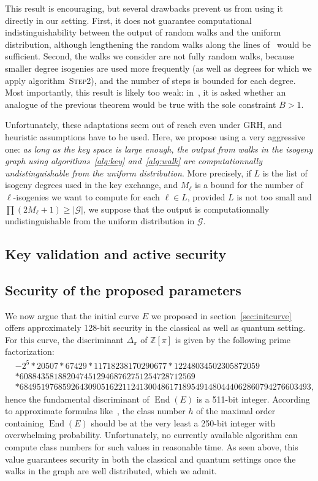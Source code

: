 \documentclass{article}
\newcommand{\Z}{\mathbb{Z}}
\newcommand{\Graph}{\mathcal{G}}
\newcommand{\algstyle}[1]{\textsc{#1}}
\theoremstyle{definition}
\DeclareMathOperator{\End}{End}
\begin{document}
This result is encouraging, but several drawbacks prevent us from
using it directly in our setting. First, it does not guarantee
computational indistinguishability between the output of random
walks and the uniform distribution, although lengthening the
random walks along the lines of~\cite[Theorem ...]{todo:expanders}
would be sufficient. Second, the walks we consider are not fully random
walks, because smaller degree isogenies are used more frequently
(as well as degrees for which we apply algorithm~\algstyle{Step2}),
and the number of steps is bounded for each degree. Most
importantly, this result is likely too weak: in~\cite[7.2]{jao+miller+venkatesan09},
it is asked whether an analogue of the previous theorem would
be true with the sole constraint $B>1$.

Unfortunately, these adaptations seem out of reach even under
GRH, and heuristic assumptions have to be used. Here, we propose using
a very aggressive one: \emph{as long as the key space is large
enough, the output from walks in the isogeny graph using algorithms~\ref{alg:key}
and~\ref{alg:walk} are computationnally undistinguishable from the uniform
distribution}. More precisely, if $L$ is the list of isogeny degrees used
in the key exchange, and $M_\ell$ is a bound for the number of $\ell$-isogenies
we want to compute for each $\ell\in L$, provided $L$ is not too small
and $\prod (2 M_\ell + 1) \geq |\Graph|$, we suppose that
the output is computationnally
undistinguishable from the uniform distribution in $\Graph$.

\subsection{Key validation and active security}



\subsection{Security of the proposed parameters}

We now argue that the initial curve $E$ we proposed in section~\ref{sec:initcurve}
offers approximately 128-bit security in the classical as well as quantum
setting. For this curve, the discriminant $\Delta_\pi$ of $\Z[\pi]$ is
given by the following prime factorization:
\[
\begin{aligned}
& -2^5 * 20507 * 67429 * 11718238170290677 * 12248034502305872059 \\
& * 60884358188204745129468762751254728712569\\
& * 68495197685926430905162211241300486171895491480444062860794276603493,
\end{aligned}
\]
hence the fundamental discriminant of $\End(E)$ is a 511-bit integer.
According to approximate formulas like~\cite{todo:classnumbers},
the class number $h$ of the maximal order containing $\End(E)$ should
be at the very least a 250-bit integer with overwhelming
probability. Unfortunately,
no currently available algorithm can compute class numbers for such values
in reasonable time. As seen above, this value guarantees security
in both the classical and quantum settings once the walks in
the graph are well distributed, which we admit.
\end{document}

